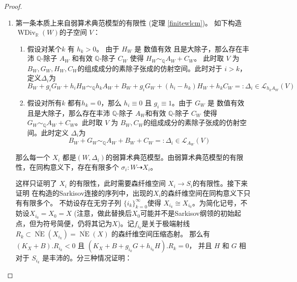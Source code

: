 \begin{proof}
  \begin{enumerate}
    \item 第一条本质上来自弱算术典范模型的有限性 (定理 \ref{finitewlcm})。  如下构造 $\operatorname{WDiv}_{\mathbb{R}}(W)$的子空间 $V$：
      \begin{enumerate}
        \item 假设对某个$k$ 有  $h_{k}>0$。 由于 $H_{W}$ 是 数值有效 且是大除子，那么存在丰沛 $\mathbb{Q}$-除子 $A_{W}$ 和有效 $\mathbb{Q}$-除子 $C_{W}$  使得 $H_{W}\sim_{\mathbb{Q}}A_{W}+C_{W}$。 此时取 $V$ 为  $B_{W},G_{W},H_{W},C_{W}$的组成成分的素除子张成的仿射空间。此时对于 $i>k$，定义$\Delta_{i}$为
              \[ B_{W}+g_{i}G_{W}+h_{i}H_{W}\sim_{\mathbb{Q}} h_{k}A_{W}+B_{W}+g_{i}G_{W}+(h_{i}-h_{k})H_{W}+h_{k}C_{W}=:\Delta_{i} \in \mathcal{L}_{h_{k}A_{W}}(V) \]
        \item 假设对所有$k$ 都有$h_{k}=0$，那么  $h_{i}\equiv 0$ 且 $g_{i}\equiv 1$。由于  $G_{W}$ 是 数值有效 且是大除子，那么存在丰沛 $\mathbb{Q}$-除子 $A_{W}$和有效 $\mathbb{Q}$-除子 $C_{W}$ 使得 $G_{W}\sim_{\mathbb{Q}}A_{W}+C_{W}$。此时取 $V$ 为  $B_{W},C_{W}$的组成成分的素除子张成的仿射空间。此时定义 $\Delta_{i}$为
              \[ B_{W}+G_{W}\sim_{\mathbb{Q}} A_{W}+B_{W}+C_{W}=:\Delta_{i} \in \mathcal{L}_{A_{W}}(V) \]
      \end{enumerate}
          那么每一个 $X_{i}$ 都是$(W,\Delta_{i})$的弱算术典范模型。由弱算术典范模型的有限性，在同构意义下，存在有限多个 $\sigma_{i}: W\dashrightarrow X_{i}$。

          这样只证明了 $X_{i}$ 的有限性，此时需要森纤维空间 $X_{i}\to S_{i}$的有限性。接下来证明 在构造的Sarkisov连接的序列中，出现的$X_{i}$的森纤维空间在同构意义下只有有限多个。
          不妨设存在无穷子列 $\{i_{k}\}_{k=0}^{\infty} $使得 $X_{i_{k}}\cong X_{i_{0}}$。为简化记号，不妨设$X_{i_{0}}=X_{0}=X$ (注意，做此替换后$X_{0}$可能并不是Sarkisov纲领的初始起点，但为符号简便，仍将其记为$X$)。记$f_{i_{k}}$是关于极端射线 $R_{k} \subset \overline{\operatorname{NE}}(X_{i_{k}})= \overline{\operatorname{NE}}(X) $ 的森纤维空间压缩态射。 那么有
          $(K_{X}+B).R_{i_{k}}<0  $ 且 $(K_{X}+B+g_{i_{k}}G+h_{i_{k}}H).R_{k}=0$， 并且 $H$ 和 $G$ 相对于 $S_{i_{k}}$ 是丰沛的。分三种情况证明：
      \begin{enumerate}


\end{enumerate}
\end{enumerate}
\end{proof}

